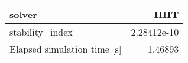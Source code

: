 \begin{tabular}{lr}
\hline
 solver                      &         HHT \\
\hline
 stability\_index             & 2.28412e-10 \\
 Elapsed simulation time [s] & 1.46893     \\
\hline
\end{tabular}
